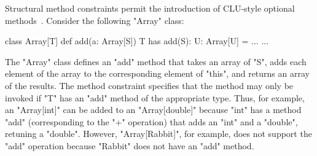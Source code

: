 
Structural method constraints permit the introduction of
CLU-style optional methods~\cite{clu}.  Consider the following
\xcd"Array" class:
\begin{xten}
class Array[T] {
  def add(a: Array[S])
    {T has add(S): U}: Array[U] = { ... }
  ...
}
\end{xten}

\noindent
The \xcd"Array" class defines an \xcd"add" method that takes 
an array of \xcd"S", adds each element of the array to the
corresponding element of \xcd"this", and returns an array of the
results.  The method constraint specifies that the method may
only be invoked if \xcd"T" has an \xcd"add" method of the
appropriate type.  Thus, for example, an \xcd"Array[int]"
can be added to an \xcd"Array[double]" because \xcd"int"
has a method \xcd"add" (corresponding to the \xcd"+" operation)
that adds an \xcd"int" and a \xcd"double", retuning a
\xcd"double".  However, \xcd"Array[Rabbit]", for example, does not support
the \xcd"add" operation because \xcd"Rabbit" does not have an
\xcd"add" method.

